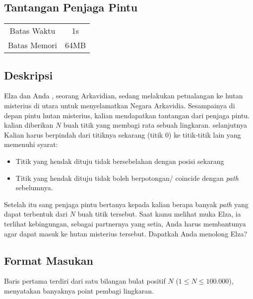 \documentclass{article}
\begin{document}
\begin{center}
    \section*{Tantangan Penjaga Pintu} %

    \begin{tabular}{ | c c | }
        \hline
        Batas Waktu  & 1s \\    %
        Batas Memori & 64MB \\  %
        \hline
    \end{tabular}
\end{center}

\subsection*{Deskripsi}

Elza dan Anda , seorang Arkavidian, sedang melakukan petualangan ke hutan misterius di utara untuk menyelamatkan Negara Arkavidia.
Sesampainya di depan pintu hutan misterius, kalian mendapatkan tantangan dari penjaga pintu.
kalian diberikan $N$ buah titik yang membagi rata sebuah lingkaran. selanjutnya Kalian harus berpindah dari titiknya
sekarang (titik 0) ke titik-titik lain yang memenuhi syarat:

\begin{itemize}
    \setlength\itemsep{0pt}
    \item Titik yang hendak dituju tidak bersebelahan dengan posisi sekarang
    \item Titik yang hendak dituju tidak boleh berpotongan/ coincide dengan \textit{path} sebelumnya.
\end{itemize}

Setelah itu sang penjaga pintu bertanya kepada kalian berapa banyak \textit{path} yang dapat terbentuk dari $N$ buah titik tersebut.
Saat kamu melihat muka Elza, ia terlihat kebingungan, sebagai partnernya yang setia, Anda harus membantunya 
agar dapat masuk ke hutan misterius tersebut. Dapatkah Anda menolong Elza?

\subsection*{Format Masukan}
Baris pertama terdiri dari satu bilangan bulat positif $N$ ($1 \leq N \leq 100.000$), menyatakan banyaknya point pembagi lingkaran.
\end{document}
